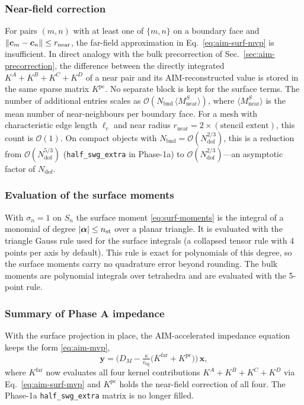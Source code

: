 \documentclass[11pt,a4paper]{article}
\begin{document}
\subsubsection*{Near-field correction}

For pairs $(m,n)$ with at least one of $\{m,n\}$ on a boundary face
and $\norm{\bm{c}_m - \bm{c}_n}\le r_{\text{near}}$, the far-field
approximation in Eq.~\eqref{eq:aim-surf-mvp} is insufficient. In
direct analogy with the bulk precorrection of
Sec.~\ref{sec:aim-precorrection}, the difference between the directly
integrated $K^{A}+K^{B}+K^{C}+K^{D}$ of a near pair and its
AIM-reconstructed value is stored in the same sparse matrix
$K^{\text{pc}}$. No separate block is kept for the surface terms. The
number of additional entries scales as
$\mathcal{O}(N_{\text{bnd}}\,\langle M^{S}_{\text{near}}\rangle)$,
where $\langle M^{S}_{\text{near}}\rangle$ is the mean number of
near-neighbours per boundary face. For a mesh with characteristic
edge length $\ell_c$ and near radius
$r_{\text{near}} = 2 \times (\text{stencil extent})$, this count is
$\mathcal{O}(1)$. On compact objects with
$N_{\text{bnd}} = \mathcal{O}(N_{\text{dof}}^{2/3})$, this is a
reduction from $\mathcal{O}(N_{\text{dof}}^{5/3})$
(\texttt{half\_swg\_extra} in Phase-1a) to
$\mathcal{O}(N_{\text{dof}}^{2/3})$---an asymptotic factor of
$N_{\text{dof}}$.

\subsubsection*{Evaluation of the surface moments}

With $\sigma_n = 1$ on $S_n$ the surface moment
\eqref{eq:surf-moments} is the integral of a monomial of degree
$\abs{\bm{\alpha}} \le n_{\text{st}}$ over a planar triangle. It is
evaluated with the triangle Gauss rule used for the surface integrals
(a collapsed tensor rule with 4 points per axis by default). This rule
is exact for polynomials of this degree, so the surface moments carry
no quadrature error beyond rounding. The bulk moments are polynomial
integrals over tetrahedra and are evaluated with the 5-point rule.

\subsubsection*{Summary of Phase A impedance}

With the surface projection in place, the AIM-accelerated impedance
equation keeps the form \eqref{eq:aim-mvp},
\begin{equation}
  \bm{y} = \bigl(D_M
      - \tfrac{\kappa}{\epsilon_{\text{bg}}}
        \bigl(K^{\text{far}} + K^{\text{pc}}\bigr)
    \bigr)\,\bm{x},
  \label{eq:aim-mvp-phaseA}
\end{equation}
where $K^{\text{far}}$ now evaluates all four kernel contributions
$K^{A}+K^{B}+K^{C}+K^{D}$ via Eq.~\eqref{eq:aim-surf-mvp} and
$K^{\text{pc}}$ holds the near-field correction of all four. The
Phase-1a \texttt{half\_swg\_extra} matrix is no longer filled.
\end{document}
